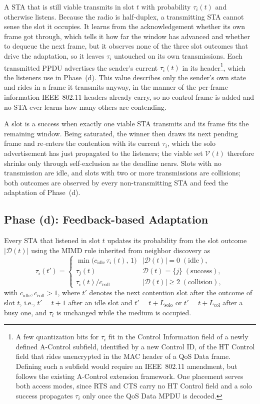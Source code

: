 \documentclass[a4paper,fleqn]{cas-dc}
\begin{document}
A STA that is still viable transmits in slot $t$ with probability $\tau_i(t)$ and otherwise listens. Because the radio is half-duplex, a transmitting STA cannot sense the slot it occupies. It learns from the acknowledgement whether its own frame got through, which tells it how far the window has advanced and whether to dequeue the next frame, but it observes none of the three slot outcomes that drive the adaptation, so it leaves $\tau_i$ untouched on its own transmissions. Each transmitted PPDU advertises the sender's current $\tau_i(t)$ in its header\footnote{A few quantization bits for $\tau_i$ fit in the Control Information field of a newly defined A-Control subfield, identified by a new Control ID, of the HT Control field that rides unencrypted in the MAC header of a QoS Data frame. Defining such a subfield would require an IEEE~802.11 amendment, but follows the existing A-Control extension framework. One placement serves both access modes, since RTS and CTS carry no HT Control field and a solo success propagates $\tau_i$ only once the QoS Data MPDU is decoded.}, which the listeners use in Phase~(d). This value describes only the sender's own state and rides in a frame it transmits anyway, in the manner of the per-frame information IEEE~802.11 headers already carry, so no control frame is added and no STA ever learns how many others are contending.

A slot is a success when exactly one viable STA transmits and its frame fits the remaining window. Being saturated, the winner then draws its next pending frame and re-enters the contention with its current $\tau_i$, which the solo advertisement has just propagated to the listeners; the viable set $\mathcal{V}(t)$ therefore shrinks only through self-exclusion as the deadline nears. Slots with no transmission are idle, and slots with two or more transmissions are collisions; both outcomes are observed by every non-transmitting STA and feed the adaptation of Phase~(d).

\subsection{Phase (d): Feedback-based Adaptation}
\label{subsec:adaptive_control}

Every STA that listened in slot $t$ updates its probability from the slot outcome $|\mathcal{D}(t)|$ using the MIMD rule inherited from neighbor discovery as
\begin{equation}
\tau_i(t') =
\begin{cases}
\min\bigl(c_\mathrm{idle}\,\tau_i(t),\,1\bigr) & |\mathcal{D}(t)|=0\;(\text{idle}),\\[2pt]
\tau_j(t)              & \mathcal{D}(t)=\{j\}\;(\text{success}),\\[2pt]
\tau_i(t) / c_\mathrm{coll}          & |\mathcal{D}(t)|\ge 2\;(\text{collision}),
\end{cases}
\label{eq:mimd}
\end{equation}
with $c_\mathrm{idle},c_\mathrm{coll}>1$, where $t'$ denotes the next contention slot after the outcome of slot $t$, i.e., $t'=t+1$ after an idle slot and $t'=t+L_\mathrm{solo}$ or $t'=t+L_\mathrm{col}$ after a busy one, and $\tau_i$ is unchanged while the medium is occupied. 
\end{document}
